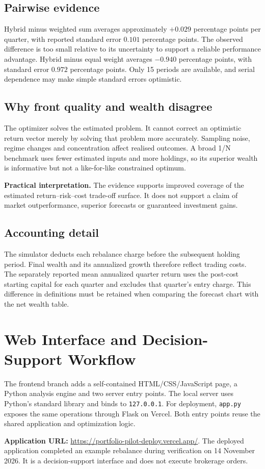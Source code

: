 \documentclass[12pt,a4paper]{article}
\newcommand{\note}[1]{\par\smallskip\noindent\colorbox{light}{\parbox{\dimexpr\linewidth-2\fboxsep}{\small #1}}\par\smallskip}
\newcommand{\newsec}[1]{\section{#1}}
\begin{document}
\subsection{Pairwise evidence}
Hybrid minus weighted sum averages approximately $+0.029$ percentage points per quarter, with reported standard error $0.101$ percentage points. The observed difference is too small relative to its uncertainty to support a reliable performance advantage. Hybrid minus equal weight averages $-0.940$ percentage points, with standard error $0.972$ percentage points. Only 15 periods are available, and serial dependence may make simple standard errors optimistic.
\subsection{Why front quality and wealth disagree}
The optimizer solves the estimated problem. It cannot correct an optimistic return vector merely by solving that problem more accurately. Sampling noise, regime changes and concentration affect realised outcomes. A broad 1/N benchmark uses fewer estimated inputs and more holdings, so its superior wealth is informative but not a like-for-like constrained optimum.
\note{\textbf{Practical interpretation.} The evidence supports improved coverage of the estimated return--risk--cost trade-off surface. It does not support a claim of market outperformance, superior forecasts or guaranteed investment gains.}
\subsection{Accounting detail}
The simulator deducts each rebalance charge before the subsequent holding period. Final wealth and its annualized growth therefore reflect trading costs. The separately reported mean annualized quarter return uses the post-cost starting capital for each quarter and excludes that quarter's entry charge. This difference in definitions must be retained when comparing the forecast chart with the net wealth table.

\newsec{Web Interface and Decision-Support Workflow}
The frontend branch adds a self-contained HTML/CSS/JavaScript page, a Python analysis engine and two server entry points. The local server uses Python's standard library and binds to \texttt{127.0.0.1}. For deployment, \texttt{app.py} exposes the same operations through Flask on Vercel. Both entry points reuse the shared application and optimization logic.

\textbf{Application URL:} \url{https://portfolio-pilot-deploy.vercel.app/}. The deployed application completed an example rebalance during verification on 14 November 2026. It is a decision-support interface and does not execute brokerage orders.
\end{document}
